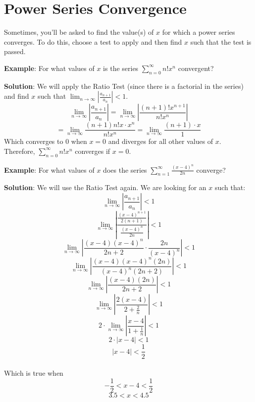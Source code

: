 \section{Power Series Convergence}
Sometimes, you'll be asked to find the value(s) of $x$ 
for which a power series converges. To do this, choose a test to apply and 
then find $x$ such that the test is passed. 

\textbf{Example}: For what values of $x$ is the series $\sum_{n=0}^\infty n!x^n$ 
convergent?

\textbf{Solution}: We will apply the Ratio Test (since there is a factorial in 
the series) and find $x$ such that $\lim_{n \to \infty} \left| \frac{a_{n+1}}{
a_n} \right| < 1$. 
$$\lim_{n \to \infty} \left| \frac{a_{n + 1}}{a_n} \right| = \lim_{n \to 
\infty} \left| \frac{(n+1)!x^{n+1}}{n!x^n} \right|$$
$$= \lim_{n \to \infty} \frac{(n+1) n! x \cdot x^n}{n!x^n} = \lim_{n \to 
\infty} \frac{(n+1) \cdot x}{1}$$
Which converges to $0$ when $x=0$ and diverges for all other values of $x$. 
Therefore, $\sum_{n=0}^\infty n!x^n$ converges if $x=0$. 

\textbf{Example}: For what values of $x$ does the series $\sum_{n=1}^\infty 
\frac{(x-4)^n}{2n}$ converge?

\textbf{Solution}: We will use the Ratio Test again. We are looking for an $x$ 
such that:
$$\lim_{n \to \infty} \left| \frac{a_{n+1}}{a_n} \right| < 1$$
$$\lim_{n \to \infty} \left| \frac{\frac{(x-4)^{n+1}}{2(n+1)}}{\frac{(x-4)^n}{
2n}} \right| < 1$$
$$\lim_{n \to \infty} \left| \frac{(x-4)(x-4)^n}{2n + 2} \cdot \frac{2n}{(x-4)^
n} \right| < 1$$
$$\lim_{n \to \infty} \left| \frac{(x-4)(x-4)^n(2n)}{(x-4)^n(2n+2)} \right| < 
1$$
$$\lim_{n \to \infty} \left| \frac{(x-4)(2n)}{2n + 2} \right| < 1$$
$$\lim_{n \to \infty} \left| \frac{2(x-4)}{2 + \frac{2}{n}} \right| < 1$$
$$2 \cdot \lim_{n \to \infty} \left| \frac{x-4}{1+ \frac{1}{n}} \right| < 1$$
$$2 \cdot \left| x-4 \right| < 1$$
$$\left| x-4 \right| < \frac{1}{2}$$\\
Which is true when 
$$-\frac{1}{2} < x-4 < \frac{1}{2}$$
$$3.5 < x < 4.5$$

